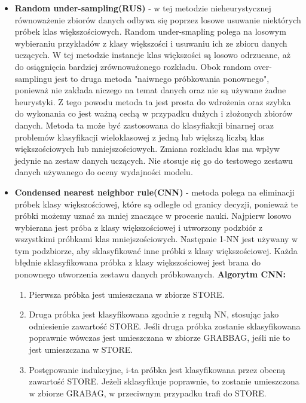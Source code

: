 \documentclass{article}
\begin{document}
\begin{itemize}
    \item \textbf{Random under-sampling(RUS)} - w tej metodzie nieheurystycznej równoważenie zbiorów danych odbywa się poprzez losowe usuwanie niektórych próbek klas większościowych. Random under-smapling polega na losowym wybieraniu przykładów z klasy większości i usuwaniu ich ze zbioru danych uczących. W tej metodzie instancje klas większości są losowo odrzucane, aż do osiągnięcia bardziej zrównoważonego rozkładu. Obok random over-samplingu jest to druga metoda "naiwnego próbkowania ponownego", ponieważ nie zakłada niczego na temat danych oraz nie są używane żadne heurystyki. Z tego powodu metoda ta jest prosta do wdrożenia oraz szybka do wykonania co jest ważną cechą w przypadku dużych i złożonych zbiorów danych. Metoda ta może być zastosowana do klasyfiakcji binarnej oraz problemów klasyfikacji wieloklasowej z jedną lub większą liczbą klas większościowych lub mniejszościowych. Zmiana rozkładu klas ma wpływ jedynie na zestaw danych uczących. Nie stosuje się go do testowego zestawu danych używanego do oceny wydajności modelu.
    \newline
    \item \textbf{Condensed nearest neighbor rule(CNN)} - metoda polega na eliminacji próbek klasy większościowej, które są odległe od granicy decyzji, ponieważ te próbki możemy uznać za mniej znaczące w procesie nauki. Najpierw losowo wybierana jest próba z klasy większościowej i utworzony podzbiór z wszystkimi próbkami klas mniejszościowych. Następnie 1-NN jest używany w tym podzbiorze, aby sklasyfikować inne próbki z klasy większościowej. Każda błędnie sklasyfikowana próbka z klasy większościowej jest brana do ponownego utworzenia zestawu danych próbkowanych. 
    \break
    \newline
    \textbf{Algorytm CNN:}
    \begin{enumerate}
        \item  Pierwsza próbka jest umieszczana w zbiorze STORE.
        
        \item  Druga próbka jest klasyfikowana zgodnie z regułą NN, stosując jako odniesienie zawartość STORE. Jeśli druga próbka zostanie sklasyfikowana poprawnie wówczas jest umieszczana w zbiorze GRABBAG, jeśli nie to jest umieszczana w STORE.
        
        \item  Postępowanie indukcyjne, i-ta próbka jest klasyfikowana przez obecną zawartość STORE. Jeżeli sklasyfikuje poprawnie, to zostanie umieszczona w zbiorze GRABAG, w przeciwnym przypadku trafi do STORE.
        

\end{enumerate}
\end{itemize}
\end{document}
